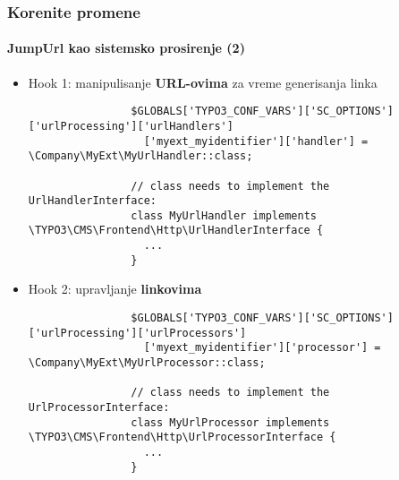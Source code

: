 
\begin{frame}[fragile]
	\frametitle{Korenite promene}
	\framesubtitle{JumpUrl kao sistemsko prosirenje (2)}

	\lstset{basicstyle=\tiny\ttfamily}

	\begin{itemize}

		\item Hook 1: manipulisanje \textbf{URL-ovima} za vreme generisanja linka

			\begin{lstlisting}
				$GLOBALS['TYPO3_CONF_VARS']['SC_OPTIONS']['urlProcessing']['urlHandlers']
				  ['myext_myidentifier']['handler'] = \Company\MyExt\MyUrlHandler::class;

				// class needs to implement the UrlHandlerInterface:
				class MyUrlHandler implements \TYPO3\CMS\Frontend\Http\UrlHandlerInterface {
				  ...
				}
			\end{lstlisting}

		\item Hook 2: upravljanje \textbf{linkovima}

			\begin{lstlisting}
				$GLOBALS['TYPO3_CONF_VARS']['SC_OPTIONS']['urlProcessing']['urlProcessors']
				  ['myext_myidentifier']['processor'] = \Company\MyExt\MyUrlProcessor::class;

				// class needs to implement the UrlProcessorInterface:
				class MyUrlProcessor implements \TYPO3\CMS\Frontend\Http\UrlProcessorInterface {
				  ...
				}
			\end{lstlisting}

	\end{itemize}

\end{frame}


